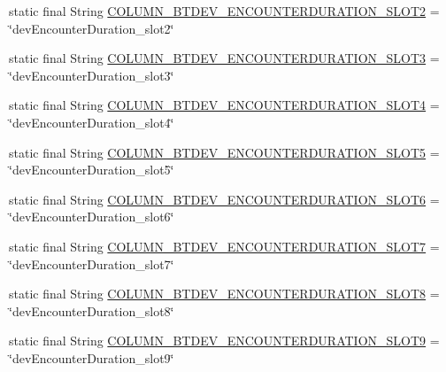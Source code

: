 \begin{DoxyCompactItemize}
\item 
static final String \hyperlink{classcom_1_1social_1_1proximity_1_1_s_q_lite_helper_a5c34a24458903b46541f5f6464fc5158}{C\+O\+L\+U\+M\+N\+\_\+\+B\+T\+D\+E\+V\+\_\+\+E\+N\+C\+O\+U\+N\+T\+E\+R\+D\+U\+R\+A\+T\+I\+O\+N\+\_\+\+S\+L\+O\+T2} = \char`\"{}dev\+Encounter\+Duration\+\_\+slot2\char`\"{}
\item 
static final String \hyperlink{classcom_1_1social_1_1proximity_1_1_s_q_lite_helper_ab17d2432d4955f20c86940a793b391d7}{C\+O\+L\+U\+M\+N\+\_\+\+B\+T\+D\+E\+V\+\_\+\+E\+N\+C\+O\+U\+N\+T\+E\+R\+D\+U\+R\+A\+T\+I\+O\+N\+\_\+\+S\+L\+O\+T3} = \char`\"{}dev\+Encounter\+Duration\+\_\+slot3\char`\"{}
\item 
static final String \hyperlink{classcom_1_1social_1_1proximity_1_1_s_q_lite_helper_a09a133f4146b7472d28124a3f783b7b9}{C\+O\+L\+U\+M\+N\+\_\+\+B\+T\+D\+E\+V\+\_\+\+E\+N\+C\+O\+U\+N\+T\+E\+R\+D\+U\+R\+A\+T\+I\+O\+N\+\_\+\+S\+L\+O\+T4} = \char`\"{}dev\+Encounter\+Duration\+\_\+slot4\char`\"{}
\item 
static final String \hyperlink{classcom_1_1social_1_1proximity_1_1_s_q_lite_helper_ac3454a41a32eb6c763bcc1b4730485a5}{C\+O\+L\+U\+M\+N\+\_\+\+B\+T\+D\+E\+V\+\_\+\+E\+N\+C\+O\+U\+N\+T\+E\+R\+D\+U\+R\+A\+T\+I\+O\+N\+\_\+\+S\+L\+O\+T5} = \char`\"{}dev\+Encounter\+Duration\+\_\+slot5\char`\"{}
\item 
static final String \hyperlink{classcom_1_1social_1_1proximity_1_1_s_q_lite_helper_a71abceb54b8d7f3d2cd4029fc2216b27}{C\+O\+L\+U\+M\+N\+\_\+\+B\+T\+D\+E\+V\+\_\+\+E\+N\+C\+O\+U\+N\+T\+E\+R\+D\+U\+R\+A\+T\+I\+O\+N\+\_\+\+S\+L\+O\+T6} = \char`\"{}dev\+Encounter\+Duration\+\_\+slot6\char`\"{}
\item 
static final String \hyperlink{classcom_1_1social_1_1proximity_1_1_s_q_lite_helper_a067a13e5269073d37f02fd3ed84d9f29}{C\+O\+L\+U\+M\+N\+\_\+\+B\+T\+D\+E\+V\+\_\+\+E\+N\+C\+O\+U\+N\+T\+E\+R\+D\+U\+R\+A\+T\+I\+O\+N\+\_\+\+S\+L\+O\+T7} = \char`\"{}dev\+Encounter\+Duration\+\_\+slot7\char`\"{}
\item 
static final String \hyperlink{classcom_1_1social_1_1proximity_1_1_s_q_lite_helper_af64db8c92d3946598301b604c023cedf}{C\+O\+L\+U\+M\+N\+\_\+\+B\+T\+D\+E\+V\+\_\+\+E\+N\+C\+O\+U\+N\+T\+E\+R\+D\+U\+R\+A\+T\+I\+O\+N\+\_\+\+S\+L\+O\+T8} = \char`\"{}dev\+Encounter\+Duration\+\_\+slot8\char`\"{}
\item 
static final String \hyperlink{classcom_1_1social_1_1proximity_1_1_s_q_lite_helper_ac158849584082cfe70d33c70cedf4755}{C\+O\+L\+U\+M\+N\+\_\+\+B\+T\+D\+E\+V\+\_\+\+E\+N\+C\+O\+U\+N\+T\+E\+R\+D\+U\+R\+A\+T\+I\+O\+N\+\_\+\+S\+L\+O\+T9} = \char`\"{}dev\+Encounter\+Duration\+\_\+slot9\char`\"{}

\end{DoxyCompactItemize}
